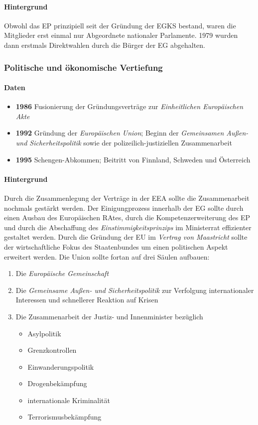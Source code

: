 \documentclass{article}
\begin{document}
	\paragraph{Hintergrund}
	Obwohl das EP prinzipiell seit der Gründung der EGKS bestand, waren die Mitglieder erst einmal nur Abgeordnete nationaler Parlamente. 1979 wurden dann erstmals Direktwahlen durch die Bürger der EG abgehalten.

	\subsubsection{Politische und ökonomische Vertiefung}
	\paragraph{Daten}
	\begin{itemize}
		\item \textbf{1986} Fusionierung der Gründungsverträge zur \textit{Einheitlichen Europäischen Akte}
		\item \textbf{1992} Gründung der \textit{Europäischen Union}; Beginn der \textit{Gemeinsamen Außen- und Sicherheitspolitik} sowie der polizeilich-justiziellen Zusammenarbeit
		\item \textbf{1995} Schengen-Abkommen; Beitritt von Finnland, Schweden und Österreich
	\end{itemize}

	\paragraph{Hintergrund}
	Durch die Zusammenlegung der Verträge in der EEA sollte die Zusammenarbeit nochmals gestärkt werden. Der Einigungprozess innerhalb der EG sollte durch einen Ausbau des Europäischen RAtes, durch die Kompetenzerweiterung des EP und durch die Abschaffung des \textit{Einstimmigkeitsprinzips} im Ministerrat effizienter gestaltet werden.
	Durch die Gründung der EU im \textit{Vertrag von Maastricht} sollte der wirtschaftliche Fokus des Staatenbundes um einen politischen Aspekt erweitert werden. Die Union sollte fortan auf drei Säulen aufbauen:

	\begin{enumerate}
		\item Die \textit{Europäische Gemeinschaft}
		\item Die \textit{Gemeinsame Außen- und Sicherheitspolitik} zur Verfolgung internationaler Interessen und schnellerer Reaktion auf Krisen
		\item Die Zusammenarbeit der Justiz- und Innenminister bezüglich 
		\begin{itemize}
			\item Asylpolitik
			\item Grenzkontrollen
			\item Einwanderungspolitik
			\item Drogenbekämpfung
			\item internationale Kriminalität
			\item Terrorismusbekämpfung
		\end{itemize}
	\end{enumerate}
\end{document}
